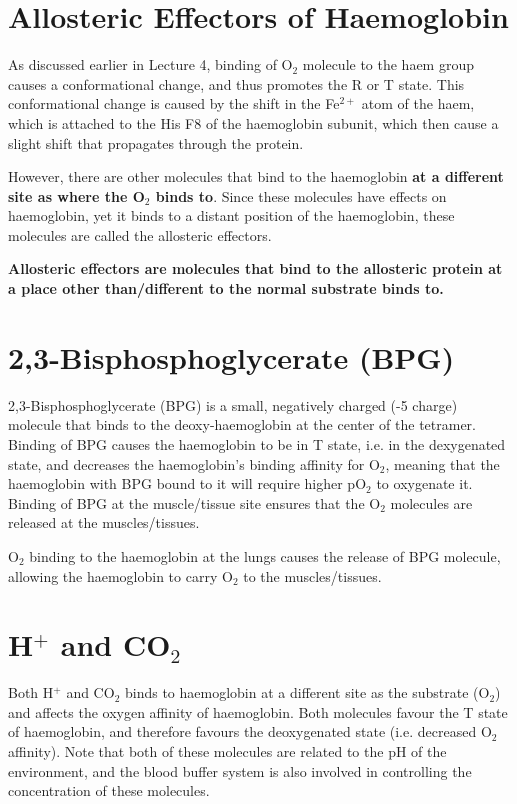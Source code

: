 \section{Allosteric Effectors of Haemoglobin}

As discussed earlier in Lecture 4, binding of O$_2$ molecule to the haem group causes a conformational change, and thus promotes the R or T state.
This conformational change is caused by the shift in the Fe$^{2+}$ atom of the haem, which is attached to the His F8 of the haemoglobin subunit, which then cause a slight shift that propagates through the protein.

However, there are other molecules that bind to the haemoglobin \textbf{at a different site as where the O$_2$ binds to}.
Since these molecules have effects on haemoglobin, yet it binds to a distant position of the haemoglobin, these molecules are called the allosteric effectors.

\vspace{0.5cm}

\begin{center}
\textbf{Allosteric effectors are molecules that bind to the allosteric protein at a place other than/different to the normal substrate binds to.}
\end{center}

\section{2,3-Bisphosphoglycerate (BPG)}

2,3-Bisphosphoglycerate (BPG) is a small, negatively charged (-5 charge) molecule that binds to the deoxy-haemoglobin at the center of the tetramer.
Binding of BPG causes the haemoglobin to be in T state, i.e. in the dexygenated state, and decreases the haemoglobin's binding affinity for O$_2$, meaning that the haemoglobin with BPG bound to it will require higher pO$_2$ to oxygenate it.
Binding of BPG at the muscle/tissue site ensures that the O$_2$ molecules are released at the muscles/tissues.

O$_2$ binding to the haemoglobin at the lungs causes the release of BPG molecule, allowing the haemoglobin to carry O$_2$ to the muscles/tissues.

\section{H$^+$ and CO$_2$}

Both H$^+$ and CO$_2$ binds to haemoglobin at a different site as the substrate (O$_2$) and affects the oxygen affinity of haemoglobin.
Both molecules favour the T state of haemoglobin, and therefore favours the deoxygenated state (i.e. decreased O$_2$ affinity).
Note that both of these molecules are related to the pH of the environment, and the blood buffer system is also involved in controlling the concentration of these molecules.

